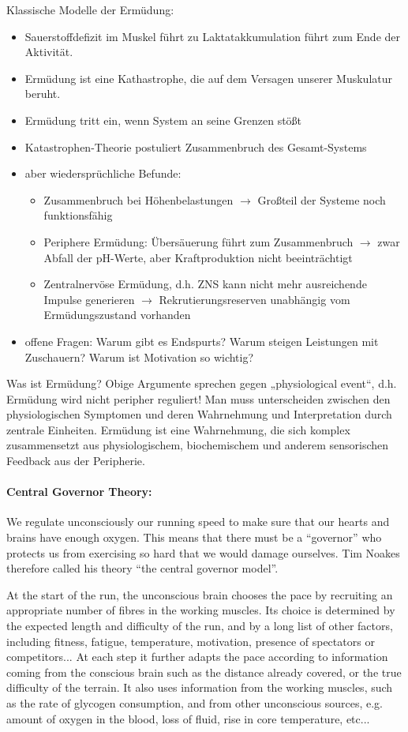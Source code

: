 Klassische Modelle der Ermüdung:
\begin{itemize}
    \item Sauerstoffdefizit im Muskel führt zu Laktatakkumulation führt zum Ende der Aktivität.
    \item Ermüdung ist eine Kathastrophe, die auf dem Versagen unserer Muskulatur beruht.
    \item Ermüdung tritt ein, wenn System an seine Grenzen stößt
    \item Katastrophen-Theorie postuliert Zusammenbruch des Gesamt-Systems
    \item aber wiedersprüchliche Befunde:
    \begin{itemize}
        \item Zusammenbruch bei Höhenbelastungen $\rightarrow$ Großteil der Systeme noch funktionsfähig
        \item Periphere Ermüdung: Übersäuerung führt zum Zusammenbruch $\rightarrow$ zwar Abfall der pH-Werte, aber Kraftproduktion nicht beeinträchtigt
        \item Zentralnervöse Ermüdung, d.h. ZNS kann nicht mehr ausreichende Impulse generieren $\rightarrow$ Rekrutierungsreserven unabhängig vom Ermüdungszustand vorhanden
    \end{itemize}
    \item offene Fragen: Warum gibt es Endspurts? Warum steigen Leistungen mit Zuschauern? Warum ist Motivation so wichtig?
\end{itemize}

Was ist Ermüdung?
Obige Argumente sprechen gegen „physiological event“, d.h. Ermüdung wird nicht peripher reguliert!
Man muss unterscheiden zwischen den physiologischen Symptomen und deren Wahrnehmung und Interpretation durch zentrale Einheiten.
Ermüdung ist eine Wahrnehmung, die sich komplex zusammensetzt aus physiologischem, biochemischem und anderem sensorischen Feedback aus der Peripherie.

\paragraph{Central Governor Theory:}
We regulate unconsciously our running speed to make sure that our hearts and brains have enough oxygen.
This means that there must be a “governor” who protects us from exercising so hard that we would damage ourselves.
Tim Noakes therefore called his theory “the  central governor model”.

At the start of the run, the unconscious brain chooses the pace by recruiting an appropriate number of fibres in the working muscles.
Its choice is determined by the expected length and difficulty of the run, and by a long list of other factors, including fitness, fatigue, temperature, motivation, presence of spectators or competitors...
At each step it further adapts the pace according to information coming from the conscious brain such as the distance already covered, or the true difficulty of the terrain.
It also uses information from the working muscles, such as the rate of glycogen consumption, and from other unconscious sources, e.g. amount of
oxygen in the blood, loss of fluid, rise in core temperature, etc...

